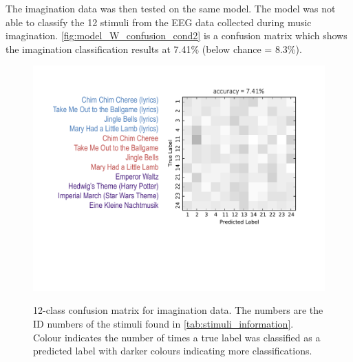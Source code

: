 The imagination data was then tested on the same model. 
The model was not able to classify the 12 stimuli from the EEG data collected during music imagination. 
\autoref{fig:model_W_confusion_cond2} is a confusion matrix which shows the imagination classification results at 7.41\% (below chance = 8.3\%). 
\begin{figure}[htb] 
  \begin{center}
    \includegraphics[width=.83\textwidth,keepaspectratio=true]{Figures/model_W_confusion_cond2}
   \\\vspace{-0.8em}
    \caption{12-class confusion matrix for imagination data. The numbers are the ID numbers of the stimuli found in \autoref{tab:stimuli_information}. Colour indicates the number of times a true label was classified as a predicted label with darker colours indicating more classifications.}
        \label{fig:model_W_confusion_cond2}
  \end{center}
  \vspace{-1em}
\end{figure}

